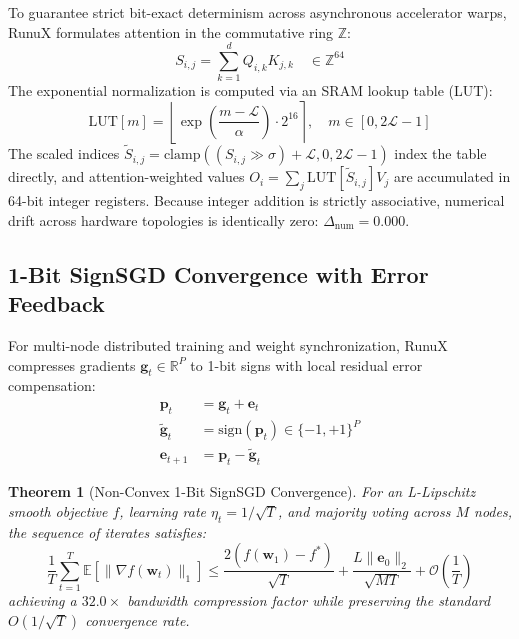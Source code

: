 \documentclass[10pt,twocolumn]{article}
\newtheorem{theorem}{Theorem}
\begin{document}
To guarantee strict bit-exact determinism across asynchronous accelerator warps, RunuX formulates attention in the commutative ring $\mathbb{Z}$:
\begin{equation}
    S_{i,j} = \sum_{k=1}^d Q_{i,k} K_{j,k} \quad \in \mathbb{Z}^{64}
\end{equation}
The exponential normalization is computed via an SRAM lookup table (LUT):
\begin{equation}
    \mathrm{LUT}[m] = \left\lfloor \exp\left( \frac{m - \mathcal{L}}{\alpha} \right) \cdot 2^{16} \right\rceil, \quad m \in [0, 2\mathcal{L}-1]
\end{equation}
The scaled indices $\tilde{S}_{i,j} = \mathrm{clamp}((S_{i,j} \gg \sigma) + \mathcal{L}, 0, 2\mathcal{L}-1)$ index the table directly, and attention-weighted values $O_i = \sum_j \mathrm{LUT}[\tilde{S}_{i,j}] V_j$ are accumulated in 64-bit integer registers. Because integer addition is strictly associative, numerical drift across hardware topologies is identically zero: $\Delta_{\mathrm{num}} = 0.000$.

\subsection{1-Bit SignSGD Convergence with Error Feedback}

For multi-node distributed training and weight synchronization, RunuX compresses gradients $\mathbf{g}_t \in \mathbb{R}^P$ to 1-bit signs with local residual error compensation:
\begin{align}
    \mathbf{p}_t &= \mathbf{g}_t + \mathbf{e}_t \\
    \tilde{\mathbf{g}}_t &= \mathrm{sign}(\mathbf{p}_t) \in \{-1, +1\}^P \\
    \mathbf{e}_{t+1} &= \mathbf{p}_t - \tilde{\mathbf{g}}_t
\end{align}

\begin{theorem}[Non-Convex 1-Bit SignSGD Convergence]
For an L-Lipschitz smooth objective $f$, learning rate $\eta_t = 1/\sqrt{T}$, and majority voting across $M$ nodes, the sequence of iterates satisfies:
\begin{equation}
    \frac{1}{T} \sum_{t=1}^T \mathbb{E}[\|\nabla f(\mathbf{w}_t)\|_1] \le \frac{2(f(\mathbf{w}_1) - f^*)}{\sqrt{T}} + \frac{L \|\mathbf{e}_0\|_2}{\sqrt{M T}} + \mathcal{O}\left(\frac{1}{T}\right)
\end{equation}
achieving a $32.0\times$ bandwidth compression factor while preserving the standard $O(1/\sqrt{T})$ convergence rate.
\end{theorem}
\end{document}
